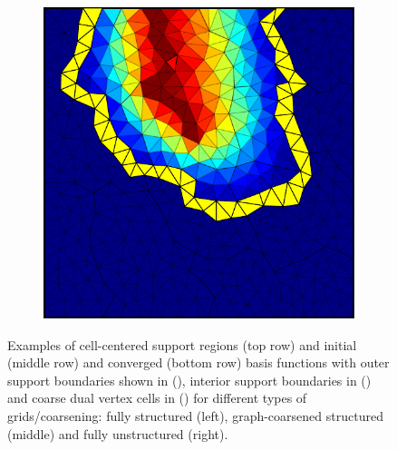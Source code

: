 \begin{figure}[htbp]
\begin{subfigure}[t]{0.3\textwidth}
  \end{subfigure}
  \hfill
  \begin{subfigure}[t]{0.3\textwidth}
    \centerline{\includegraphics[width=0.9\linewidth]{figs/square_tria_metis_cell_conv}}
  \end{subfigure}
  \caption[Cell-centered support and basis function examples]{\label{fig:square_cell_basis} Examples of cell-centered support regions (top row) and initial (middle row) and converged (bottom row) basis functions with outer support boundaries shown in (), interior support boundaries in () and coarse dual vertex cells in () for different types of grids/coarsening: fully structured (left), graph-coarsened structured (middle) and fully unstructured (right).}
\end{figure}

